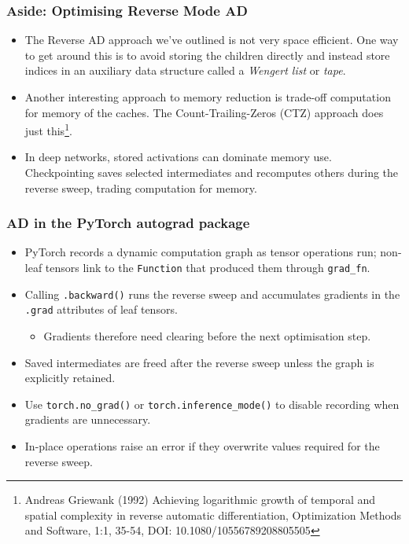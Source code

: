 \documentclass[]{article}
\begin{document}
\begin{frame}
\frametitle{Aside: Optimising Reverse Mode AD}
\begin{itemize}
	\item<+-> The Reverse AD approach we've outlined is not very space efficient. One way to get around this is to avoid storing the children directly and instead store indices in an auxiliary data structure called a \emph{Wengert list} or \emph{tape}.
	\item<+-> Another interesting approach to memory reduction is trade-off computation for memory of the caches. The Count-Trailing-Zeros (CTZ) approach does just this\footnote{Andreas Griewank (1992) Achieving logarithmic growth of temporal and spatial complexity in reverse automatic differentiation, Optimization Methods and Software, 1:1, 35-54, DOI: 10.1080/10556789208805505}.
	\item<+-> In deep networks, stored activations can dominate memory use. Checkpointing saves selected intermediates and recomputes others during the reverse sweep, trading computation for memory.
\end{itemize}
\end{frame}

\begin{frame}
\frametitle{AD in the PyTorch autograd package}

\begin{itemize}
	\item<+-> PyTorch records a dynamic computation graph as tensor operations run; non-leaf tensors link to the \lstinline!Function! that produced them through \lstinline!grad_fn!.
	\item<+-> Calling \lstinline!.backward()! runs the reverse sweep and accumulates gradients in the \lstinline!.grad! attributes of leaf tensors.
	\begin{itemize}
		\item<+-> Gradients therefore need clearing before the next optimisation step.
	\end{itemize}
	\item<+-> Saved intermediates are freed after the reverse sweep unless the graph is explicitly retained.
	\item<+-> Use \lstinline!torch.no_grad()! or \lstinline!torch.inference_mode()! to disable recording when gradients are unnecessary.
	\item<+-> In-place operations raise an error if they overwrite values required for the reverse sweep.
\end{itemize}
\end{frame}
\end{document}
